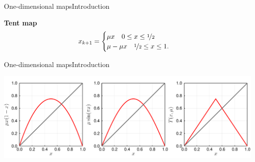 \documentclass[usenames,dvipsnames,svgnames,10pt,aspectratio=169]{beamer}
\begin{document}
\begin{frame}[t, c]{One-dimensional maps}{Introduction}
\begin{minipage}{.38\textwidth}
		\begin{block}{\centering \textbf{Tent map}}
			\centering
			\[
				x_{k+1} = \begin{cases}
										\mu x \quad 0 \leq x \leq \nicefrac{1}{2} \\
										\mu - \mu x \quad \nicefrac{1}{2} \leq x \leq 1.
									\end{cases}
			\]
		\end{block}

	\end{minipage}

	\vspace{1cm}
\end{frame}

\begin{frame}[t, c]{One-dimensional maps}{Introduction}
	\centering

	\includegraphics[width=.8\textwidth]{1D_maps_introduction}

	\vspace{1cm}
\end{frame}
\end{document}
